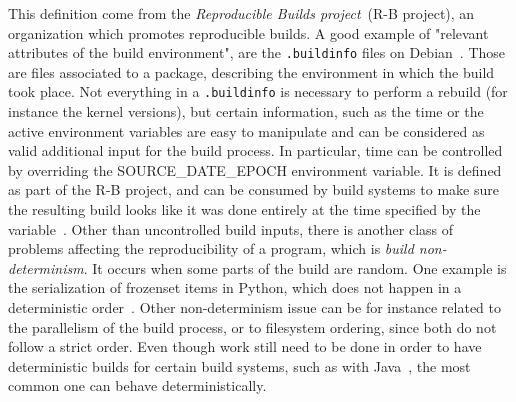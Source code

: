 \documentclass[a4paper,11pt,oneside]{report}
\theoremstyle{definition}
\newcommand{\rb}{reproducible builds\xspace}
\newcommand{\sde}{SOURCE\_DATE\_EPOCH\xspace}
\begin{document}
This definition come from the \emph{Reproducible Builds project}~(R-B project),
an organization which promotes \rb. A good example of "relevant attributes of
the build environment", are the \verb|.buildinfo| files on
Debian~\cite{debian:buildinfo}. Those are files associated to a package,
describing the environment in which the build took place. Not everything in a
\verb|.buildinfo| is necessary to perform a rebuild (for instance the kernel
versions), but certain information, such as the time or the active environment
variables are easy to manipulate and can be considered as valid additional
input for the build process. In particular, time can be controlled by
overriding the \sde environment variable. It is defined as part of the R-B
project, and can be consumed by build systems to make sure the resulting build
looks like it was done entirely at the time specified by the
variable~\cite{rb:sde}.
Other than uncontrolled build inputs, there is another class of problems
affecting the reproducibility of a program, which is \emph{build
non-determinism}. It occurs when some parts of the build are random. One
example is the serialization of frozenset items in Python, which does not
happen in a deterministic order~\cite{gh:pyc-frozenset}. Other non-determinism
issue can be for instance related to the parallelism of the build process, or
to filesystem ordering, since both do not follow a strict order. Even though
work still need to be done in order to have deterministic builds for certain
build systems, such as with Java~\cite{xiong2022towards}, the most common one
can behave deterministically.
\end{document}
